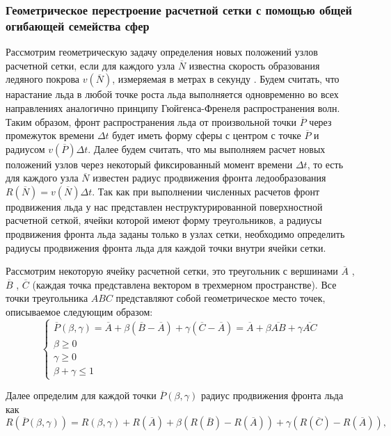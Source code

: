 \subsubsection{Геометрическое перестроение расчетной сетки с помощью общей огибающей семейства сфер}

Рассмотрим геометрическую задачу определения новых положений узлов расчетной сетки, если для каждого узла $\overline{N}$ известна скорость образования ледяного покрова $v(\overline{N})$, измеряемая в метрах в секунду \cite{Rybakov2023GeoRemesh}.
Будем считать, что нарастание льда в любой точке роста льда выполняется одновременно во всех направлениях аналогично принципу Гюйгенса-Френеля распространения волн.
Таким образом, фронт распространения льда от произвольной точки $\overline{P}$ через промежуток времени $\Delta t$ будет иметь форму сферы с центром с точке $\overline{P}$ и радиусом $v(\overline{P})\Delta t$.
Далее будем считать, что мы выполняем расчет новых положений узлов через некоторый фиксированный момент времени $\Delta t$, то есть для каждого узла $\overline{N}$ известен радиус продвижения фронта ледообразования $R(\overline{N}) = v(\overline{N}) \Delta t$.
Так как при выполнении численных расчетов фронт продвижения льда у нас представлен неструктурированной поверхностной расчетной сеткой, ячейки которой имеют форму треугольников, а радиусы продвижения фронта льда заданы только в узлах сетки, необходимо определить радиусы продвижения фронта льда для каждой точки внутри ячейки сетки.

Рассмотрим некоторую ячейку расчетной сетки, это треугольник с вершинами $\overline{A}$ , $\overline{B}$ , $\overline{C}$ (каждая точка представлена вектором в трехмерном пространстве).
Все точки треугольника $ABC$ представляют собой геометрическое место точек, описываемое следующим образом:
\begin{equation}
	\left\{
		\begin{aligned}
			\overline{P}(\beta, \gamma) = \overline{A} + \beta(\overline{B} - \overline{A}) + \gamma(\overline{C} - \overline{A}) = \overline{A} + \beta \overline{AB} + \gamma \overline{AC} \\
			\beta \ge 0 \\
			\gamma \ge 0 \\
			\beta + \gamma \le 1
		\end{aligned}
	\right.
\end{equation}

Далее определим для каждой точки $\overline{P}(\beta,\gamma)$ радиус продвижения фронта льда как
\begin{equation}
	R(\overline{P}(\beta,\gamma)) = R(\beta,\gamma) + R(\overline{A}) + \beta(R(\overline{B}) - R(\overline{A})) + \gamma(R(\overline{C}) - R(\overline{A})),
\end{equation}

